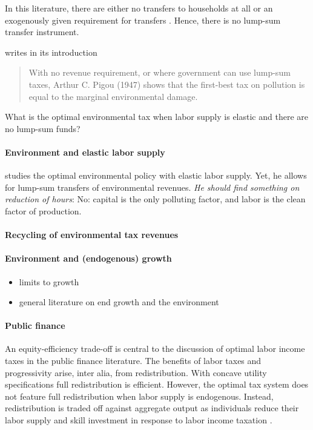 In this literature, there are either no transfers to households at all \citep{Bovenberg2002EnvironmentalRegulation, LansBovenberg1994EnvironmentalTaxation} or an exogenously given requirement for transfers \citep{Barrage2019OptimalPolicy}. Hence, there is no lump-sum transfer instrument.

\citep{Fullerton1997EnvironmentalComment} writes in its introduction 
\begin{quote}
	With no revenue requirement, or where government can use lump-sum taxes, Arthur C. Pigou (1947) shows that the first-best tax on pollution is equal to the marginal environmental damage.
\end{quote}
\ar What is the optimal environmental tax when labor supply is elastic and there are no lump-sum funds?
\paragraph{Environment and elastic labor supply}
\cite{Oueslati2002EnvironmentalSupply} studies the optimal environmental policy with elastic labor supply. Yet, he allows for lump-sum transfers of environmental revenues. \textit{He should find something on reduction of hours}: No: capital is the only polluting factor, and labor is the clean factor of production.
\paragraph{Recycling of environmental tax revenues}
\cite{Fried2018TheGenerations}
\paragraph{Environment and (endogenous) growth}
\begin{itemize}
	\item limits to growth
	\item general literature on end growth and the environment
\end{itemize}
\paragraph{Public finance}
An equity-efficiency trade-off is central to the discussion of optimal labor income taxes in the public finance literature.  The benefits of labor taxes and progressivity arise, inter alia, from redistribution. %
With concave utility specifications full redistribution is efficient. However, the optimal tax system does not feature full redistribution when labor supply is endogenous. Instead, redistribution is traded off against aggregate output as individuals reduce their labor supply and skill investment in response to labor income taxation \citep{Heathcote2017OptimalFramework, Conesa2009TaxingAll, Domeij2004OnTaxes}.

